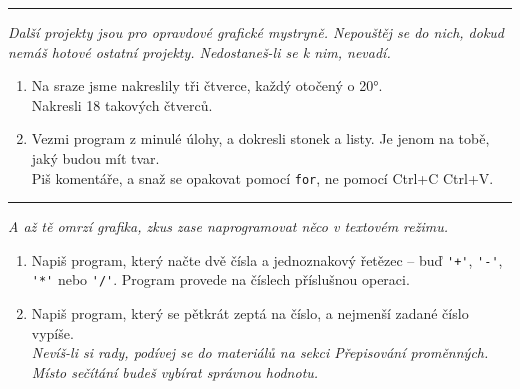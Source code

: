 \documentclass[a4paper,10pt]{article}
\newcommand\startsection[1]{
     \vspace{0.2ex}
    \hrule
    {\fontspec{Oxygen} \tiny
     \vspace{-1ex}
     \emph{#1}
     \vspace{-1.5em}
    }
}
\begin{document}
\startsection{Další projekty jsou pro opravdové grafické mystryně. Nepouštěj se do nich, dokud nemáš hotové ostatní projekty.
Nedostaneš-li se k nim, nevadí.}

\begin{enumerate}[resume]
\item Na sraze jsme nakreslily tři čtverce, každý otočený o 20°.
    \\Nakresli 18 takových čtverců.

\item Vezmi program z minulé úlohy, a dokresli stonek a listy.
    Je jenom na tobě, jaký budou mít tvar.
    \\Piš komentáře, a snaž se opakovat pomocí \verb+for+,
        ne pomocí Ctrl+C Ctrl+V.

\end{enumerate}

\startsection{A až tě omrzí grafika, zkus zase naprogramovat něco v textovém režimu.}

\begin{enumerate}[resume]
\item Napiš program, který načte dvě čísla a jednoznakový řetězec
    – buď \verb!'+'!, \verb!'-'!, \verb!'*'! nebo \verb!'/'!.
    Program provede na číslech příslušnou operaci.

\item Napiš program, který se pětkrát zeptá na číslo, a nejmenší zadané číslo vypíše.
    \\\emph{\small Nevíš-li si rady, podívej se do materiálů na sekci Přepisování proměnných.
            Místo sečítání budeš vybírat správnou hodnotu.}

\end{enumerate}
\end{document}

